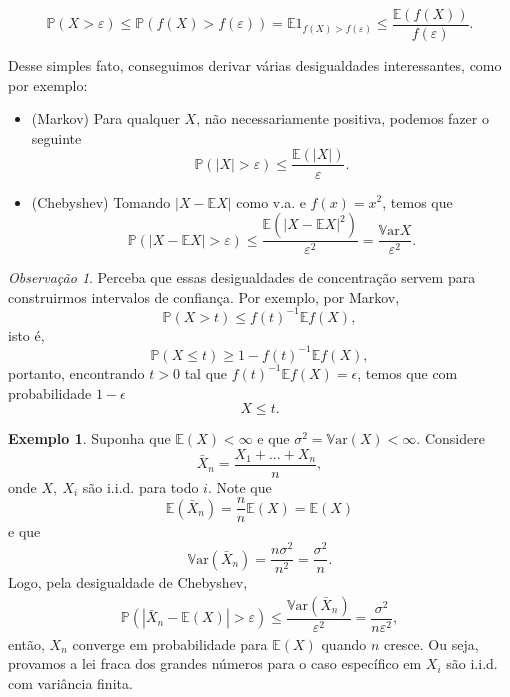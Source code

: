 \documentclass[12pt,a4paper,oneside]{book}
\theoremstyle{definition}
\newtheorem{example}[theorem]{Exemplo}
\theoremstyle{remark}
\newtheorem{remark}[theorem]{Observa\c{c}\~ao}
\numberwithin{equation}{section}
\newcommand{\e}{\varepsilon}
\newcommand{\E}{\mathbb{E}}
\newcommand{\pr}{\mathbb{P}}
\newcommand{\Var}{\mathbb{V}\text{ar}}
\begin{document}
\begin{equation}\label{markovineq}
\pr(X>\e) \leq \pr(f(X)>f(\e)) = \E 1_{f(X)>f(\e)} \leq \dfrac{\E(f(X))}{f(\e)}.
\end{equation}

Desse simples fato, conseguimos derivar várias desigualdades interessantes, como por exemplo:

\begin{itemize}
\item  (Markov) Para qualquer $X$, não necessariamente positiva, podemos fazer o seguinte  $$\pr(|X|>\e)  \leq \dfrac{\E(|X|)}{\e}.$$
\item (Chebyshev) Tomando $|X-\E X|$ como v.a. e $f(x)=x^2$, temos que
$$\pr(|X-\E X|>\e)  \leq \dfrac{ \E(|X-\E X|^2) }{\e^2} =\dfrac{ \Var X }{\e^2} .$$

\end{itemize}



\begin{tcolorbox}[colback = yellow!60]
\begin{remark}
Perceba que essas desigualdades de concentração servem para construirmos intervalos de confiança. Por exemplo, por Markov,
$$\pr(X>t)\leq f(t)^{-1}\E f(X), $$
isto é,
$$\pr(X\leq t)\geq 1- f(t)^{-1}\E f(X), $$
portanto, encontrando $t> 0$ tal que $f(t)^{-1}\E f(X) = \epsilon$, temos que com probabilidade $1-\epsilon$
$$ X\leq t.$$
\end{remark}
\end{tcolorbox}


\begin{tcolorbox}
\begin{example}
Suponha que $\E(X)<\infty$ e que $\sigma^2 = \Var(X)<\infty$. Considere
$$\bar{X}_n = \dfrac{X_1+\dots+X_n}{n}, $$
onde $X,\ X_i$ são i.i.d. para todo $i.$ Note que
$$\E(\bar{X}_n)  = \dfrac{n}{n}\E(X) = \E(X)$$ 
e que
$$\Var(\bar{X}_n)  =  \dfrac{n\sigma^2}{n^2}=  \dfrac{\sigma^2}{n}.$$
Logo, pela desigualdade de Chebyshev, 
\begin{align*}
\pr(|\bar{X}_n - \E(X)|>\e)\leq \dfrac{\Var(\bar{X}_n)}{\e^2} = \dfrac{\sigma^2}{n\e^2},
\end{align*}
então,  $X_n$ converge em probabilidade para $\E(X)$  quando $n$ cresce. Ou seja, provamos a lei fraca dos grandes números para o caso específico em $X_i$ são i.i.d. com variância finita.
\end{example}
\end{tcolorbox}
\end{document}
